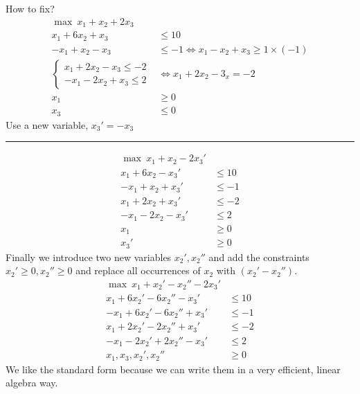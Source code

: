 \documentclass[12 pt]{article}
\begin{document}
        How to fix?
        \begin{align*}
          \max \ x_1 + x_2 + 2x_3 & 
          \\ x_1 + 6x_2 + x_3 & \leq 10
          \\ -x_1 + x_2 - x_3 & \leq -1 \iff x_1 - x_2 + x_3 \geq 1 \times (-1)
          \\
          \begin{cases}
            x_1 + 2x_2 - x_3 \leq -2
            \\ -x_1 - 2x_2 + x_3 \leq 2
          \end{cases} & \iff
          x_1 + 2x_2 - 3_x = -2 
          \\ x_1 & \geq 0  
          \\ x_3 & \leq 0  
        \end{align*}
        Use a new variable, $x_3' = -x_3$
        \\ \noindent \rule{\textwidth}{0.5pt}
        \begin{align*}
          \max \ x_1 + x_2 - 2x_3' & 
          \\ x_1 + 6x_2 - x_3' & \leq 10
          \\ -x_1 + x_2 + x_3' & \leq -1
          \\ x_1 + 2x_2 + x_3' & \leq -2
          \\ -x_1 - 2x_2 - x_3' & \leq 2
          \\ x_1 & \geq 0  
          \\ x_3' & \geq 0  
        \end{align*}
        Finally we introduce two new variables $x_2', x_2''$ and add
        the constraints $x_2' \geq 0, x_2'' \geq 0$ and replace all
        occurrences of $x_2$ with $(x_2'-x_2'')$.
        \begin{align*}
          \max \ x_1 + x_2'-x_2'' - 2x_3' & 
          \\ x_1 + 6x_2' - 6x_2'' - x_3' & \leq 10
          \\ -x_1 + 6x_2'-6x_2'' + x_3' & \leq -1
          \\ x_1 + 2x_2' - 2x_2'' + x_3' & \leq -2
          \\ -x_1 - 2x_2' + 2x_2'' - x_3' & \leq 2
          \\ x_1, x_3, x_2', x_2'' & \geq 0  
        \end{align*}
        We like the standard form because we can write them in a very efficient,
        linear algebra way.
\end{document}
